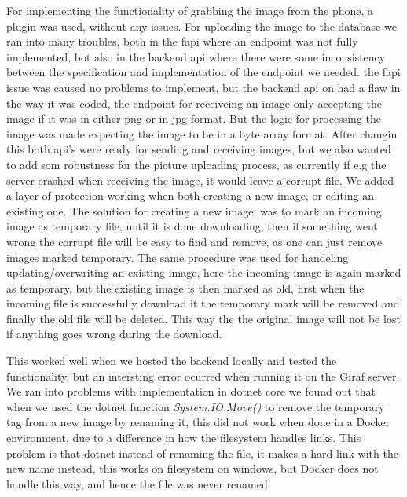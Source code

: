 For implementing the functionality of grabbing the image from the phone, a plugin was used, without any issues.
For uploading the image to the database we ran into many troubles, both in the \gls{fapi} where an endpoint was not fully implemented, bot also in the backend \gls{api} where there were some inconsistency between the specification and implementation of the endpoint we needed. the \gls{fapi} issue was caused no problems to implement, but the backend \gls{api} on had a flaw in the way it was coded, the endpoint for receiveing an image only accepting the image if it was in either png or in jpg format. But the logic for processing the image was made expecting the image to be in a byte array format. 
After changin this both api's were ready for sending and receiving images, but we also wanted to add som robustness for the picture uploading process, as currently if e.g the server crashed when receiving the image, it would leave a corrupt file. We added a layer of protection working when both creating a new image, or editing an existing one. The solution for creating a new image, was to mark an incoming image as temporary file, until it is done downloading, then if something went wrong the corrupt file will be easy to find and remove, as one can just remove images marked temporary. The same procedure was used for handeling updating/overwriting an existing image, here the incoming image is again marked as temporary, but the existing image is then marked as old, first when the incoming file is successfully download it the temporary mark will be removed and finally the old file will be deleted. This way the  the original image will not be lost if anything goes wrong during the download.


This worked well when we hosted the backend locally and tested the functionality, but an intersting error ocurred when running it on the Giraf server. We ran into problems with implementation in dotnet core we found out that when we used the dotnet function \textit{System.IO.Move()} to remove the temporary tag from a new image by renaming it, this did not work when done in a Docker environment, due to a difference in how the filesystem handles links. This problem is that dotnet instead of renaming the file, it makes a hard-link with the new name instead, this works on filesystem on windows, but Docker does not handle this way, and hence the file was never renamed.